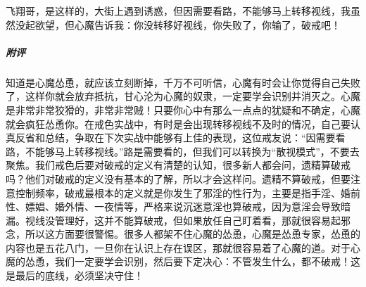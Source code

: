 \begin{case}
    飞翔哥，是这样的，大街上遇到诱惑，但因需要看路，不能够马上转移视线，我虽然没起欲望，但心魔告诉我：你没转移好视线，你失败了，你输了，破戒吧！
    \subparagraph{附评} 知道是心魔怂恿，就应该立刻断掉，千万不可听信，心魔有时会让你觉得自己失败了，这样你就会放弃抵抗，甘心沦为心魔的奴隶，一定要学会识别并消灭之。心魔是非常非常狡猾的，非常非常贼！只要你心中有那么一点点的犹疑和不确定，心魔就会疯狂怂恿你。在戒色实战中，有时是会出现转移视线不及时的情况，自己要认真反省和总结，争取在下次实战中能够有上佳的表现，这位戒友说：“因需要看路，不能够马上转移视线。”路是需要看的，但我们可以转换为“散视模式”，不要去聚焦。我们戒色后要对破戒的定义有清楚的认知，很多新人都会问，遗精算破戒吗？他们对破戒的定义没有基本的了解，所以才会这样问。遗精不算破戒，但要注意控制频率，破戒最根本的定义就是你发生了邪淫的性行为，主要是指手淫、婚前性、嫖娼、婚外情、一夜情等，严格来说沉迷意淫也算破戒，因为意淫会导致暗漏。视线没管理好，这并不能算破戒，但如果放任自己盯着看，那就很容易起邪念，所以这方面要很警惕。很多人都架不住心魔的怂恿，心魔是怂恿专家，怂恿的内容也是五花八门，一旦你在认识上存在误区，那就很容易着了心魔的道。对于心魔的怂恿，我们一定要学会识别，然后要下定决心：不管发生什么，都不破戒！这是最后的底线，必须坚决守住！
\end{case}

